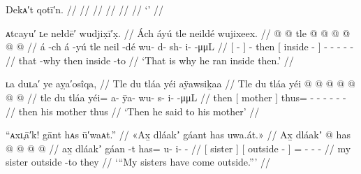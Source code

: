 \ex\label{ex:92-174-}%
%
\begingl
	\glpreamble	Dekᴀ′t qotī′n. //
	\glpreamble	 //
	\gla	 //
	\glb	 //
	\glc	 //
	\gld	 //
	\glft	‘’
		//
\endgl
\xe


\ex\label{ex:92-175-thats-why-ran-inside}%
%
\begingl
	\glpreamble	ᴀtcayu′ ʟe nełdē′ wudjix̣ī′x̣. //
	\glpreamble	Ách áyú tle neildé wujixeex. //
	\gla	{}  @ {} {}  @ {}
		tle {}  @ {} {}  @ {} @ {} @ {} @ {} @ {} //
	\glb	{} á -ch {} á -yú
		tle {} neil -dé {} wu- d- sh- i-  -μμL //
	\glc	{}[  - {}]  -
		then {}[ inside - {}]
		- - - -  - //
	\gld	{} that -why {}  {}
		then {} inside -to {}  //
	\glft	‘That is why he ran inside then.’
		//
\endgl
\xe

\ex\label{ex:92-176-then-said-to-mother}%
%
\begingl
	\glpreamble	ʟa duʟa′ ye aỵa′osîqa, //
	\glpreamble	Tle du tláa yéi aÿawsiḵaa //
	\gla	Tle {} du tláa {}
		yéi @  @ {} @ {} @ {} @ {} @ {} @ {} //
	\glb	tle {} du tláa {}
		yéi= a- ÿa- wu- s- i-  -μμL //
	\glc	then {}[  mother {}]
		thus= - - - - -
			 - //
	\gld	then {} his mother {}
		thus  {} {} {} {} {} {} //
	\glft	‘Then he said to his mother’
		//
\endgl
\xe

\ex\label{ex:92-177-my-sisters-outside}%
%
\begingl
	\glpreamble	“ᴀxʟ̣ā′k! gānt hᴀs ū′waᴀt.” //
	\glpreamble	«\!Ax̱ dláakʼ gáant has uwa.át.\!» //
	\gla	{} Ax̱ dláakʼ {}
		{}  @ {} {}
		has @  @ {} @ {} @ {} //
	\glb	{} ax̱ dláakʼ {}
		{} gáan -t {}
		has= u- i-  - //
	\glc	{}[  sister {}]
		{}[ outside - {}]
		= - -  - //
	\gld	{} my sister {}
		{} outside -to {}
		they  {} {} {} //
	\glft	‘“My sisters have come outside.”’
		//
\endgl
\xe

